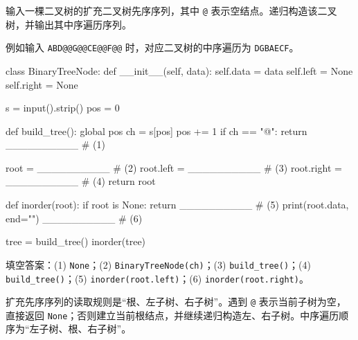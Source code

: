 \begin{question}[由扩充二叉树先序序列构造二叉树]
输入一棵二叉树的扩充二叉树先序序列，其中 \texttt{@} 表示空结点。递归构造该二叉树，并输出其中序遍历序列。

例如输入 \texttt{ABD@@G@@CE@@F@@} 时，对应二叉树的中序遍历为 \texttt{DGBAECF}。

\begin{pycode}
class BinaryTreeNode:
    def __init__(self, data):
        self.data = data
        self.left = None
        self.right = None


s = input().strip()
pos = 0


def build_tree():
    global pos
    ch = s[pos]
    pos += 1
    if ch == "@":
        return __________                       # (1)

    root = __________                           # (2)
    root.left = __________                      # (3)
    root.right = __________                     # (4)
    return root


def inorder(root):
    if root is None:
        return
    __________                                  # (5)
    print(root.data, end="")
    __________                                  # (6)


tree = build_tree()
inorder(tree)
\end{pycode}
\begin{solution}
填空答案：(1) \texttt{None}；(2) \texttt{BinaryTreeNode(ch)}；(3) \texttt{build\_tree()}；(4) \texttt{build\_tree()}；(5) \texttt{inorder(root.left)}；(6) \texttt{inorder(root.right)}。

扩充先序序列的读取规则是“根、左子树、右子树”。遇到 \texttt{@} 表示当前子树为空，直接返回 \texttt{None}；否则建立当前根结点，并继续递归构造左、右子树。中序遍历顺序为“左子树、根、右子树”。
\end{solution}
\end{question}

